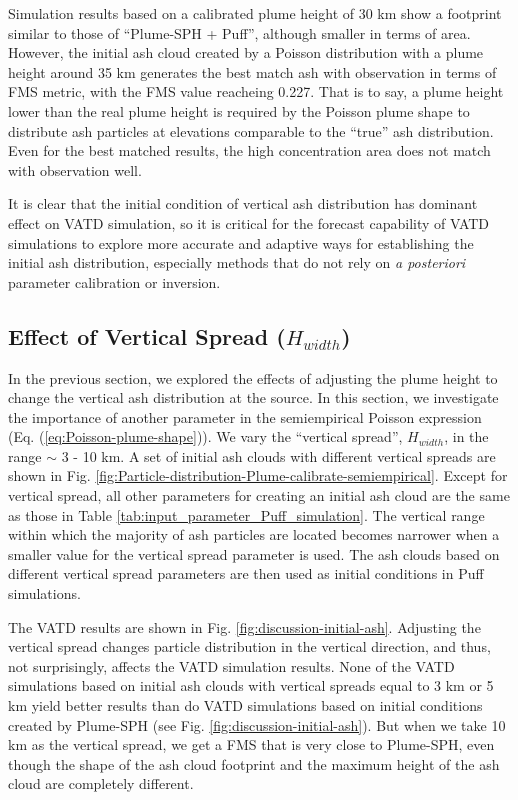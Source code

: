 \documentclass[utf8]{frontiersSCNS} %
\begin{document}
Simulation results based on a calibrated plume height of 30 km show a footprint similar to those of ``Plume-SPH + Puff'', although smaller in terms of area. However, the initial ash cloud created by a Poisson distribution with a plume height around 35 km generates the best match ash with observation in terms of FMS metric, with the FMS value reacheing 0.227.  That is to say, a plume height lower than the real plume height is required by the Poisson plume shape to distribute ash particles at elevations comparable to the ``true'' ash distribution. Even for the best matched results, the high concentration area does not match with observation well.

It is clear that the initial condition of vertical ash distribution has dominant effect on VATD simulation, so it is critical for the forecast capability of VATD simulations to explore more accurate and adaptive ways for establishing the initial ash distribution, especially methods that do not rely on \textit{a posteriori} parameter calibration or inversion.

\subsection{Effect of Vertical Spread ($H_{width}$)}
In the previous section, we explored the effects of adjusting the plume height to change the vertical ash distribution at the source. In this section, we investigate the importance of another parameter in the semiempirical Poisson expression (Eq. (\ref{eq:Poisson-plume-shape})). We vary the ``vertical spread'', $H_{width}$, in the range $\sim$ 3 - 10 km. A set of initial ash clouds  with different vertical spreads are shown in Fig. \ref{fig:Particle-distribution-Plume-calibrate-semiempirical}. Except for vertical spread, all other parameters for creating an initial ash cloud are the same as those in Table \ref{tab:input_parameter_Puff_simulation}. The vertical range within which the majority of ash particles are located becomes narrower when a smaller value for the vertical spread parameter is used. The ash clouds based on different vertical spread parameters are then used as initial conditions in Puff simulations.

The VATD results are shown in Fig. \ref{fig:discussion-initial-ash}. Adjusting the vertical spread changes particle distribution in the vertical direction, and thus, not surprisingly, affects the VATD simulation results. None of the VATD simulations based on initial ash clouds with vertical spreads equal to 3 km or 5 km yield better results than do VATD simulations based on initial conditions created by Plume-SPH (see Fig. \ref{fig:discussion-initial-ash}). But when we take 10 km as the vertical spread, we get a FMS that is very close to Plume-SPH, even though the shape of the ash cloud footprint and the maximum height of the ash cloud are completely different.
\end{document}
